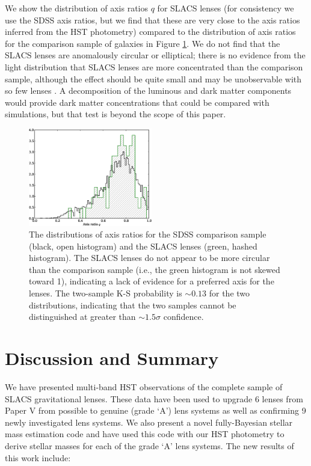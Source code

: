 \documentclass[iop]{emulateapj}
\begin{document}
We show the distribution of axis ratios $q$ for SLACS lenses (for consistency we use the SDSS axis ratios, but we find that these are very close to the axis ratios inferred from the HST photometry) compared to the distribution of axis ratios for the comparison sample of galaxies in Figure \ref{F_ellipticity_comparison}. We do not find that the SLACS lenses are anomalously circular or elliptical; there is no evidence from the light distribution that SLACS lenses are more concentrated than the comparison sample, although the effect should be quite small and may be unobservable with so few lenses \citep[e.g.,][]{rozo}. A decomposition of the luminous and dark matter components would provide dark matter concentrations that could be compared with simulations, but that test is beyond the scope of this paper.

\begin{figure}[ht]
 \centering
 \includegraphics[width=0.48\textwidth,clip]{f11.eps}
 \caption{The distributions of axis ratios for the SDSS comparison sample (black, open histogram) and the SLACS lenses (green, hashed histogram). The SLACS lenses do not appear to be more circular than the comparison sample (i.e., the green histogram is not skewed toward 1), indicating a lack of evidence for a preferred axis for the lenses. The two-sample K-S probability is $\sim0.13$ for the two distributions, indicating that the two samples cannot be distinguished at greater than $\sim 1.5\sigma$ confidence.}
 \label{F_ellipticity_comparison}
\end{figure}



\section{Discussion and Summary}
We have presented multi-band HST observations of the complete sample of SLACS gravitational lenses. These data have been used to upgrade 6 lenses from Paper V from possible to genuine (grade `A') lens systems as well as confirming 9 newly investigated lens systems. We also present a novel fully-Bayesian stellar mass estimation code and have used this code with our HST photometry to derive stellar masses for each of the grade `A' lens systems. The new results of this work include:
\end{document}

